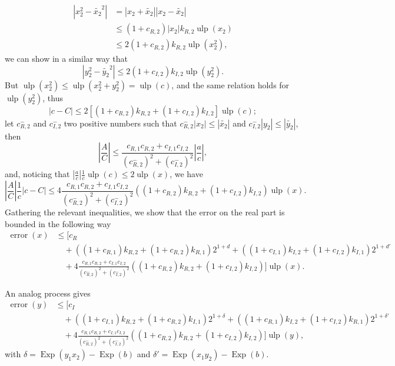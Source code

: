 \documentclass {article}
\newcommand {\corr}[1]{\widetilde {#1}}
\newcommand {\Ulp}{{\operatorname {ulp}}}
\DeclareMathOperator{\Exp}{\operatorname {Exp}}
\newcommand{\error}{\operatorname {error}}
\renewcommand {\leq}{\leqslant}
\begin{document}
\begin{align*}
\left|x_2^2-\corr{x_2}^2\right| &= \left|x_2+\corr{x_2}\right|
\left|x_2-\corr{x_2}\right|\\ &\leq (1+c_{R,2})|x_2|k_{R,2}
\Ulp(x_2)\\ &\leq 2(1+c_{R,2})k_{R,2}\Ulp(x_2^2),
\end{align*}
we can show in a similar way that
\[
\left|y_2^2-\corr{y_2}^2\right| \leq 2(1+c_{I,2})k_{I,2}\Ulp(y_2^2).
\]
But $\Ulp(x_2^2) \leq \Ulp(x_2^2+y_2^2) = \Ulp(c)$, and the same relation
holds for $\Ulp(y_2^2)$, thus
\[
|c-C| \leq 2\left[(1+c_{R,2})k_{R,2}+(1+c_{I,2})k_{I,2}\right]\Ulp(c);
\]
let $c_{R,2}^-$ and $c_{I,2}^-$ two positive numbers such that $c_{R,2}^-|x_2|
\leq \left|\corr{x_2}\right|$ and $c_{I,2}^-|y_2| \leq
\left|\corr{y_2}\right|$, then
\[
\left|\frac{A}{C}\right| \leq
\frac{c_{R,1}c_{R,2}+c_{I,1}c_{I,2}}{(c_{R,2}^-)^2+(c_{I,2}^-)^2}
\left|\frac{a}{c}\right|,
\]
and, noticing that $\left|\frac{a}{c}\right|\frac{1}{c}\Ulp(c) \leq 2\Ulp(x)$,
we have
\[
\left|\frac{A}{C}\right|\frac{1}{c}|c-C| \leq
4\frac{c_{R,1}c_{R,2}+c_{I,1}c_{I,2}}{(c_{R,2}^-)^2+(c_{I,2}^-)^2}
\left((1+c_{R,2})k_{R,2}+(1+c_{I,2})k_{I,2}\right)\Ulp(x).
\]
Gathering the relevant inequalities, we show that the error on the real part
is bounded in the following way
\begin{equation*}
  \begin{split}
    \error(x) &\leq [c_R\\
    &\quad+\left((1+c_{R,1})k_{R,2}+(1+c_{R,2})k_{R,1}\right)2^{1+d}
    +\left((1+c_{I,1})k_{I,2}+(1+c_{I,2})k_{I,1}\right)2^{1+d'}\\
    &\quad+4\frac{c_{R,1}c_{R,2}+c_{I,1}c_{I,2}}{(c_{R,2}^-)^2+(c_{I,2}^-)^2}
    \left((1+c_{R,2})k_{R,2}+(1+c_{I,2})k_{I,2}\right)]
    \Ulp(x).
  \end{split}
\end{equation*}

An analog process gives
\begin{equation*}
  \begin{split}
    \error(y) &\leq [c_I\\
    &\quad+\left((1+c_{I,1})k_{R,2}+(1+c_{R,2})k_{I,1}\right)2^{1+\delta}
    +\left((1+c_{R,1})k_{I,2}+(1+c_{I,2})k_{R,1}\right)2^{1+\delta'}\\
    &\quad+4\frac{c_{R,1}c_{R,2}+c_{I,1}c_{I,2}}{(c_{R,2}^-)^2+(c_{I,2}^-)^2}
    \left((1+c_{R,2})k_{R,2}+(1+c_{I,2})k_{I,2}\right)]
    \Ulp(y),
  \end{split}
\end{equation*}
with $\delta=\Exp(y_1x_2)-\Exp(b)$ and $\delta'=\Exp(x_1y_2)-\Exp(b)$.
\end{document}
